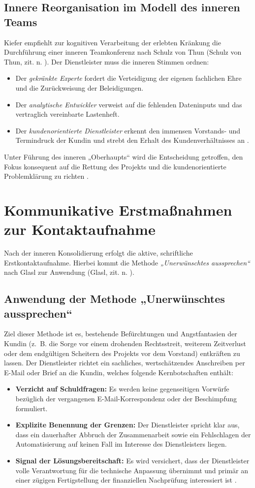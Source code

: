 \subsection{Innere Reorganisation im Modell des inneren Teams}
Kiefer empfiehlt zur kognitiven Verarbeitung der erlebten Kränkung die Durchführung einer inneren Teamkonferenz nach Schulz von Thun (Schulz von Thun, zit. n. \cite[S.~48--52]{3}). Der Dienstleister muss die inneren Stimmen ordnen:
\begin{itemize}
    \item Der \textit{gekränkte Experte} fordert die Verteidigung der eigenen fachlichen Ehre und die Zurückweisung der Beleidigungen.
    \item Der \textit{analytische Entwickler} verweist auf die fehlenden Dateninputs und das vertraglich vereinbarte Lastenheft.
    \item Der \textit{kundenorientierte Dienstleister} erkennt den immensen Vorstands- und Termindruck der Kundin und strebt den Erhalt des Kundenverhältnisses an \cite[S.~48--49]{3}.
\end{itemize}
Unter Führung des inneren „Oberhaupts“ wird die Entscheidung getroffen, den Fokus konsequent auf die Rettung des Projekts und die kundenorientierte Problemklärung zu richten \cite[S.~49--50]{3}.

\section{Kommunikative Erstmaßnahmen zur Kontaktaufnahme}
Nach der inneren Konsolidierung erfolgt die aktive, schriftliche Erstkontaktaufnahme. Hierbei kommt die Methode \textit{„Unerwünschtes aussprechen“} nach Glasl zur Anwendung (Glasl, zit. n. \cite[S.~48]{5}).

\subsection{Anwendung der Methode „Unerwünschtes aussprechen“}
Ziel dieser Methode ist es, bestehende Befürchtungen und Angstfantasien der Kundin (z.~B. die Sorge vor einem drohenden Rechtsstreit, weiterem Zeitverlust oder dem endgültigen Scheitern des Projekts vor dem Vorstand) entkräften zu lassen. Der Dienstleister richtet ein sachliches, wertschätzendes Anschreiben per E-Mail oder Brief an die Kundin, welches folgende Kernbotschaften enthält:
\begin{itemize}
    \item \textbf{Verzicht auf Schuldfragen:} Es werden keine gegenseitigen Vorwürfe bezüglich der vergangenen E-Mail-Korrespondenz oder der Beschimpfung formuliert.
    \item \textbf{Explizite Benennung der Grenzen:} Der Dienstleister spricht klar aus, dass ein dauerhafter Abbruch der Zusammenarbeit sowie ein Fehlschlagen der Automatisierung auf keinen Fall im Interesse des Dienstleisters liegen.
    \item \textbf{Signal der Lösungsbereitschaft:} Es wird versichert, dass der Dienstleister volle Verantwortung für die technische Anpassung übernimmt und primär an einer zügigen Fertigstellung der finanziellen Nachprüfung interessiert ist \cite[S.~47--48]{5}.
\end{itemize}

